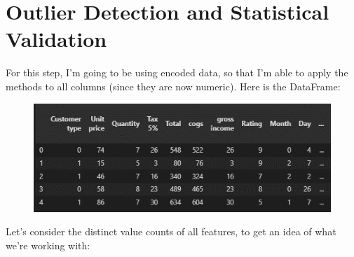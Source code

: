 
\chapter{Outlier Detection and Statistical Validation} %

\label{Chapter11} %

For this step, I'm going to be using encoded data, so that I'm able to apply the methods to all columns (since they are now numeric). Here is the DataFrame:

\begin{figure}[h]
    \centering
    \includegraphics[width=1\textwidth]{Chapters/ch11/data_1.png}
\end{figure}


Let’s consider the distinct value counts of all features, to get an idea of what we’re working with:

